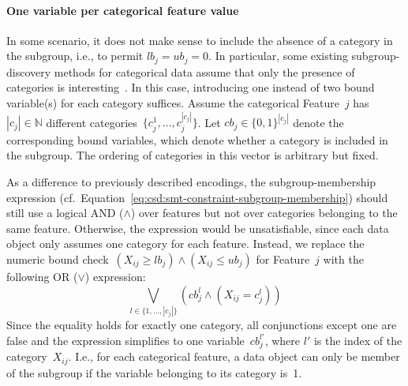\documentclass{article}
\theoremstyle{definition}
\begin{document}
\paragraph{One variable per categorical feature value}

In some scenario, it does not make sense to include the absence of a category in the subgroup, i.e., to permit $\mathit{lb}_j = \mathit{ub}_j = 0$.
In particular, some existing subgroup-discovery methods for categorical data assume that only the presence of categories is interesting~\cite{atzmueller2015subgroup}.
In this case, introducing one instead of two bound variable(s) for each category suffices.
Assume the categorical Feature~$j$ has $|c_j| \in \mathbb{N}$ different categories~$\{c^1_j, \dots, c^{|c_j|}_j\}$.
Let $\mathit{cb}_j \in \{0, 1\}^{|c_j|}$ denote the corresponding bound variables, which denote whether a category is included in the subgroup.
The ordering of categories in this vector is arbitrary but fixed.

As a difference to previously described encodings, the subgroup-membership expression (cf.~Equation~\ref{eq:csd:smt-constraint-subgroup-membership}) should still use a logical AND ($\land$) over features but not over categories belonging to the same feature.
Otherwise, the expression would be unsatisfiable, since each data object only assumes one category for each feature.
Instead, we replace the numeric bound check~$\left( X_{ij} \geq \mathit{lb}_j \right) \land \left( X_{ij} \leq \mathit{ub}_j \right)$ for Feature~$j$ with the following OR ($\lor$) expression:
%
\begin{equation}
	\bigvee_{l \in \{1, \dots, |c_j|\}} \left( \mathit{cb}^l_j \land \left(  X_{ij} = c^l_j \right) \right)
	\label{eq:csd:category-constraint:or}
\end{equation}
%
Since the equality holds for exactly one category, all conjunctions except one are false and the expression simplifies to one variable~$\mathit{cb}^{l'}_j$, where $l'$ is the index of the category~$X_{ij}$.
I.e., for each categorical feature, a data object can only be member of the subgroup if the variable belonging to its category is~1.
\end{document}

